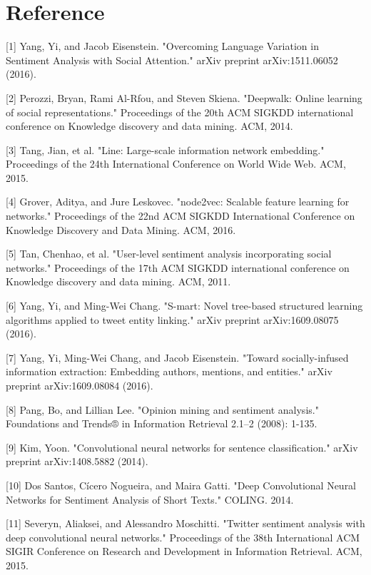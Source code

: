 
\section*{Reference}
\small

[1] Yang, Yi, and Jacob Eisenstein. "Overcoming Language Variation in Sentiment Analysis with Social Attention." arXiv preprint  arXiv:1511.06052 (2016).

[2] Perozzi, Bryan, Rami Al-Rfou, and Steven Skiena. "Deepwalk: Online learning of social representations." Proceedings of the 20th ACM SIGKDD international conference on Knowledge discovery and data mining. ACM, 2014.

[3] Tang, Jian, et al. "Line: Large-scale information network embedding." Proceedings of the 24th International Conference on World Wide Web. ACM, 2015.

[4] Grover, Aditya, and Jure Leskovec. "node2vec: Scalable feature learning for networks." Proceedings of the 22nd ACM SIGKDD International Conference on Knowledge Discovery and Data Mining. ACM, 2016.

[5] Tan, Chenhao, et al. "User-level sentiment analysis incorporating social networks." Proceedings of the 17th ACM SIGKDD international conference on Knowledge discovery and data mining. ACM, 2011.

[6] Yang, Yi, and Ming-Wei Chang. "S-mart: Novel tree-based structured learning algorithms applied to tweet entity linking." arXiv preprint arXiv:1609.08075 (2016).

[7] Yang, Yi, Ming-Wei Chang, and Jacob Eisenstein. "Toward socially-infused information extraction: Embedding authors, mentions, and entities." arXiv preprint arXiv:1609.08084 (2016).

[8] Pang, Bo, and Lillian Lee. "Opinion mining and sentiment analysis." Foundations and Trends® in Information Retrieval 2.1–2 (2008): 1-135.

[9] Kim, Yoon. "Convolutional neural networks for sentence classification." arXiv preprint arXiv:1408.5882 (2014).

[10] Dos Santos, Cícero Nogueira, and Maira Gatti. "Deep Convolutional Neural Networks for Sentiment Analysis of Short Texts." COLING. 2014.

[11] Severyn, Aliaksei, and Alessandro Moschitti. "Twitter sentiment analysis with deep convolutional neural networks." Proceedings of the 38th International ACM SIGIR Conference on Research and Development in Information Retrieval. ACM, 2015.